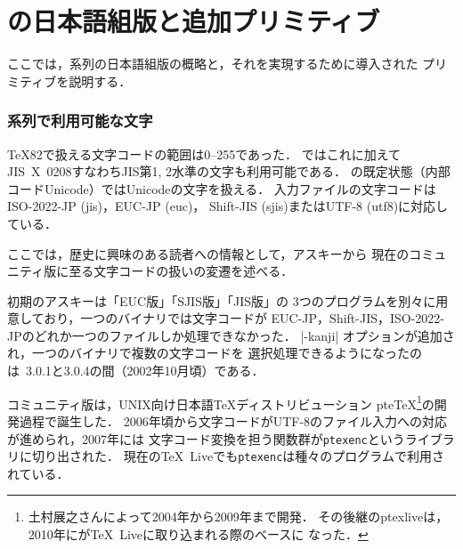 \documentclass[a4paper,11pt,nomag,dvipdfmx]{jsarticle}
\def\code#1{\texttt{#1}}
\begin{document}
\clearpage


\part{\pTeX の日本語組版と追加プリミティブ}

ここでは，\pTeX 系列の日本語組版の概略と，それを実現するために導入された
プリミティブを説明する．

\section{\pTeX 系列で利用可能な文字}
\label{sec:ptexchar}


\TeX82で扱える文字コードの範囲は0--255であった．
\pTeX ではこれに加えてJIS~X~0208すなわちJIS第1, 2水準の文字も利用可能である．
\upTeX の既定状態（内部コードUnicode）ではUnicodeの文字を扱える．
入力ファイルの文字コードはISO-2022-JP (jis)，EUC-JP (euc)，
Shift-JIS (sjis)またはUTF-8 (utf8)に対応している．

\begin{dangerous}
ここでは，歴史に興味のある読者への情報として，アスキー\pTeX から
現在のコミュニティ版\pTeX に至る文字コードの扱いの変遷を述べる．

初期のアスキー\pTeX は「EUC版\pTeX 」「SJIS版\pTeX 」「JIS版\pTeX 」の
3つのプログラムを別々に用意しており，一つの\pTeX バイナリでは文字コードが
EUC-JP，Shift-JIS，ISO-2022-JPのどれか一つのファイルしか処理できなかった．
|-kanji| オプションが追加され，一つの\pTeX バイナリで複数の文字コードを
選択処理できるようになったのは\pTeX~3.0.1と3.0.4の間（2002年10月頃）である．

コミュニティ版\pTeX は，UNIX向け日本語\TeX ディストリビューション
pte\TeX\footnote{土村展之さんによって2004年から2009年まで開発．
その後継のptexliveは，2010年に\pTeX が\TeX~Liveに取り込まれる際のベースに
なった．}の開発過程で誕生した．
2006年頃から文字コードがUTF-8のファイル入力への対応が進められ，2007年には
文字コード変換を担う関数群が\code{ptexenc}というライブラリに切り出された．
現在の\TeX~Liveでも\code{ptexenc}は種々のプログラムで利用されている．
\end{dangerous}
\end{document}
